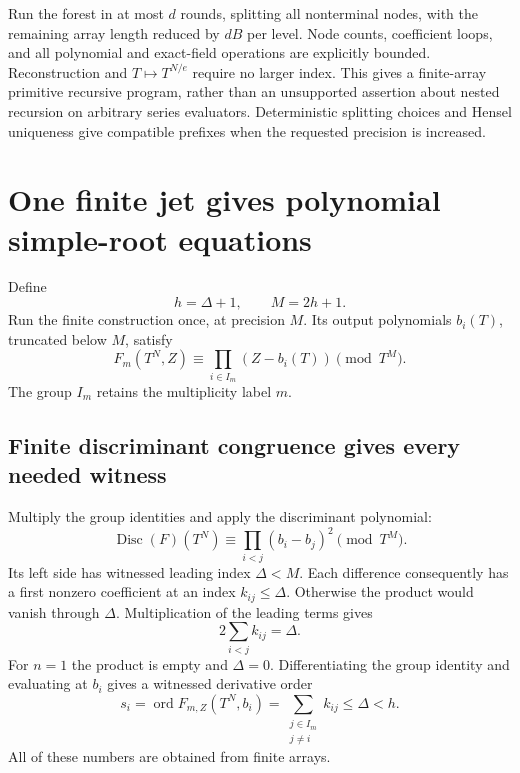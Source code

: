 \documentclass[11pt]{article}
\theoremstyle{definition}
\newcommand{\ord}{\operatorname{ord}}
\newcommand{\disc}{\operatorname{Disc}}
\begin{document}
Run the forest in at most \(d\) rounds, splitting all nonterminal nodes,
with the remaining array length reduced by \(dB\) per level.
Node counts, coefficient loops, and all polynomial and exact-field
operations are explicitly bounded.
Reconstruction and \(T\mapsto T^{N/e}\) require no larger index.
This gives a finite-array primitive recursive program, rather than an
unsupported assertion about nested recursion on arbitrary series evaluators.
Deterministic splitting choices and Hensel uniqueness give compatible
prefixes when the requested precision is increased.

\section{One finite jet gives polynomial simple-root equations}
\label{sec:bootstrap}
Define
\begin{equation}
 h=\Delta+1,\qquad M=2h+1.
 \label{eq:bootstrap-budget}
\end{equation}
Run the finite construction once, at precision \(M\). Its output polynomials
\(b_i(T)\), truncated below \(M\), satisfy
\begin{equation}
 F_m(T^N,Z)\equiv\prod_{i\in I_m}(Z-b_i(T))\pmod{T^M}.
 \label{eq:jet-splitting}
\end{equation}
The group \(I_m\) retains the multiplicity label \(m\).

\subsection{Finite discriminant congruence gives every needed witness}
Multiply the group identities and apply the discriminant polynomial:
\begin{equation}
 \disc(F)(T^N)\equiv\prod_{i<j}(b_i-b_j)^2\pmod{T^M}.
 \label{eq:finite-disc}
\end{equation}
Its left side has witnessed leading index \(\Delta<M\).
Each difference consequently has a first nonzero coefficient at an index
\(k_{ij}\le\Delta\). Otherwise the product would vanish through \(\Delta\).
Multiplication of the leading terms gives
\[
 2\sum_{i<j}k_{ij}=\Delta.
\]
For \(n=1\) the product is empty and \(\Delta=0\).
Differentiating the group identity and evaluating at \(b_i\) gives
a witnessed derivative order
\[
 s_i=\ord F_{m,Z}(T^N,b_i)
     =\sum_{\substack{j\in I_m\\j\ne i}}k_{ij}\le\Delta<h.
\]
All of these numbers are obtained from finite arrays.
\end{document}
